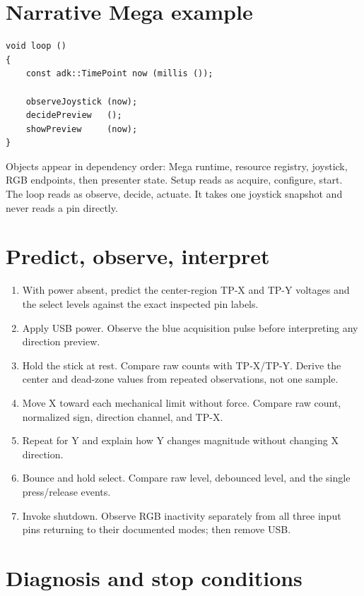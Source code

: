 \documentclass[11pt]{article}
\begin{document}
\section{Narrative Mega example}

\begin{lstlisting}[style=adkcpp]
void loop ()
{
    const adk::TimePoint now (millis ());

    observeJoystick (now);
    decidePreview   ();
    showPreview     (now);
}
\end{lstlisting}

Objects appear in dependency order: Mega runtime, resource registry, joystick,
RGB endpoints, then presenter state. Setup reads as acquire, configure, start.
The loop reads as observe, decide, actuate. It takes one joystick snapshot and
never reads a pin directly.

\section{Predict, observe, interpret}

\begin{enumerate}
  \item With power absent, predict the center-region TP-X and TP-Y voltages and
        the select levels against the exact inspected pin labels.
  \item Apply USB power. Observe the blue acquisition pulse before interpreting
        any direction preview.
  \item Hold the stick at rest. Compare raw counts with TP-X/TP-Y. Derive the
        center and dead-zone values from repeated observations, not one sample.
  \item Move X toward each mechanical limit without force. Compare raw count,
        normalized sign, direction channel, and TP-X.
  \item Repeat for Y and explain how Y changes magnitude without changing X
        direction.
  \item Bounce and hold select. Compare raw level, debounced level, and the
        single press/release events.
  \item Invoke shutdown. Observe RGB inactivity separately from all three input
        pins returning to their documented modes; then remove USB.
\end{enumerate}

\section{Diagnosis and stop conditions}
\end{document}
